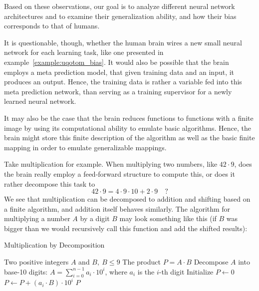 \documentclass[../../main.tex]{subfiles}
\begin{document}
    Based on these observations, our goal is to analyze different neural network architectures and to examine their generalization ability, and how their bias corresponds to that of humans.

    \begin{remark}
        It is questionable, though, whether the human brain wires a new small neural network for each learning task, like one presented in example~\ref{example:uqotom_bias}. It would also be possible that the brain employs a meta prediction model, that given training data and an input, it produces an output. Hence, the training data is rather a variable fed into this meta prediction network, than serving as a training supervisor for a newly learned neural network.
    \end{remark}

    It may also be the case that the brain reduces functions to functions with a finite image by using its computational ability to emulate basic algorithms. Hence, the brain might store this finite description of the algorithm as well as the basic finite mapping in order to emulate generalizable mappings.

    \begin{example}
        Take multiplication for example. When multiplying two numbers, like $42 \cdot 9$, does the brain really employ a feed-forward structure to compute this, or does it rather decompose this task to
        \[
            42 \cdot 9 = 4 \cdot 9 \cdot 10 + 2 \cdot 9 \quad ?
        \]
        We see that multiplication can be decomposed to addition and shifting based on a finite algorithm, and addition itself behaves similarly. The algorithm for multiplying a number $A$ by a digit $B$ may look something like this (if $B$ was bigger than we would recursively call this function and add the shifted results):
        \begin{algorithm}
        \caption{Multiplication by Decomposition}
        \begin{algorithmic}[1]
        \REQUIRE Two positive integers $A$ and $B, \ B \leq 9$
        \ENSURE The product $P = A \cdot B$
        \STATE Decompose $A$ into base-10 digits: $A = \sum_{i=0}^{n-1} a_i \cdot 10^i$, where $a_i$ is the $i$-th digit
        \STATE Initialize $P \leftarrow 0$
            \STATE $P \leftarrow P + (a_i \cdot B) \cdot 10^i$
        \ENDFOR
        \RETURN $P$
        \end{algorithmic}
        \end{algorithm}
    \end{example}
\end{document}
